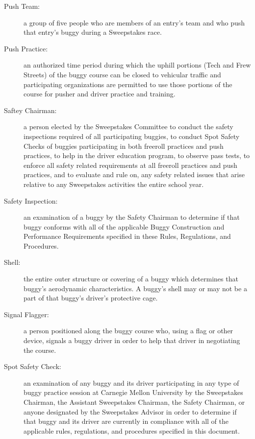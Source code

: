 \begin{description}
	\item[Push Team:]
	a group of five people who are members of an entry's team and who push that
	entry's buggy during a Sweepstakes race.

	\item[Push Practice:]
	an authorized time period during which the uphill portions (Tech and Frew
	Streets) of the buggy course can be closed to vehicular traffic and
	participating organizations are permitted to use those portions of the course
	for pusher and driver practice and training.

	\item[Saftey Chairman:]
	a person elected by the Sweepstakes Committee to conduct the safety
	inspections required of all participating buggies, to conduct Spot Safety
	Checks of buggies participating in both freeroll practices and push practices,
	to help in the driver education program, to observe pass tests, to enforce all
	safety related requirements at all freeroll practices and push practices, and
	to evaluate and rule on, any safety related issues that arise relative to any
	Sweepstakes activities the entire school year.

	\item[Safety Inspection:]
	an examination of a buggy by the Safety Chairman to determine if that buggy
	conforms with all of the applicable Buggy Construction and Performance
	Requirements specified in these Rules, Regulations, and Procedures.

	\item[Shell:]
	the entire outer structure or covering of a buggy which determines that
	buggy's aerodynamic characteristics. A buggy's shell may or may not be a part
	of that buggy's driver's protective cage.

	\item[Signal Flagger:]
	a person positioned along the buggy course who, using a flag or other
	device, signals a buggy driver in order to help that driver in negotiating the
	course.

	\item[Spot Safety Check:]
	an examination of any buggy and its driver participating in any type of
	buggy practice session at Carnegie Mellon University by the Sweepstakes
	Chairman, the Assistant Sweepstakes Chairman, the Safety Chairman, or anyone
	designated by the Sweepstakes Advisor in order to determine if that buggy and
	its driver are currently in compliance with all of the applicable rules,
	regulations, and procedures specified in this document.


\end{description}
